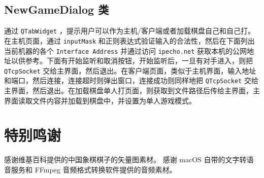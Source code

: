 \documentclass[11pt]{article}
\begin{document}
\subsection{NewGameDialog 类}
\label{sec:org24286fd}
通过 \texttt{QTabWidget} ，提示用户可以作为主机/客户端或者加载棋盘自己和自己打。在主机页面，通过 \texttt{inputMask} 和正则表达式验证输入的合法性，然后在下面列出当前机器的各个 \texttt{Interface Address} 并通过访问 \texttt{ipecho.net} 获取本机的公网地址以供参考。下面有开始监听和取消按钮，开始监听后，一旦有对手进入，则把 \texttt{QTcpSocket} 交给主界面，然后退出。在客户端页面，类似于主机界面，输入地址和端口，然后连接，连接超时则弹出窗口，连接成功则同样地把 \texttt{QTcpSocket} 交给主界面，然后退出。在加载棋盘单人打页面，则获取到文件路径后传给主界面，主界面读取文件内容并加载到棋盘中，并设置为单人游戏模式。

\section{特别鸣谢}
\label{sec:org8432c25}
感谢维基百科提供的中国象棋棋子的矢量图素材。
感谢 macOS 自带的文字转语音服务和 FFmpeg 音频格式转换软件提供的音频素材。
\end{document}
